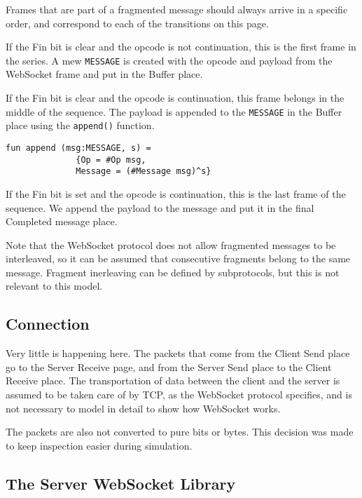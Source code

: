 			
			Frames that are part of a fragmented message should always arrive in a
			specific order, and correspond to each of the transitions on this page. 
			
			If the Fin bit is clear and the opcode is not continuation, this is the first
			frame in the series. A mew \lstinline:MESSAGE: is created with the opcode and
			payload from the WebSocket frame and put in the Buffer place.
			
			If the Fin bit is clear and the opcode is continuation, this frame belongs in
			the middle of the sequence. The payload is appended to the
			\lstinline:MESSAGE: in the Buffer place using the \lstinline:append():
			function.
			
			\begin{lstlisting}[label=lst:append,caption=append,gobble=3]
			fun append (msg:MESSAGE, s) = 
			  {Op = #Op msg,
			  Message = (#Message msg)^s}
			\end{lstlisting}
			
			If the Fin bit is set and the opcode is continuation, this is the last frame
			of the sequence. We append the payload to the message and put it in the final
			Completed message place. 
			
			Note that the WebSocket protocol does not allow fragmented messages to be
			interleaved, so it can be assumed that consecutive fragments belong to the
			same message. Fragment inerleaving can be defined by subprotocols, but this
			is not relevant to this model.
			
\subsection{Connection}

	
	Very little is happening here. The packets that come from the Client Send place
	go to the Server Receive page, and from the Server Send place to the Client
	Receive place. The transportation of data between the client and the server is
	assumed to be taken care of by TCP, as the WebSocket protocol specifies, and is
	not necessary to model in detail to show how WebSocket works.
	
	The packets are also not converted to pure bits or bytes. This decision was
	made to keep inspection easier during simulation. 

\subsection{The Server WebSocket Library}
	
